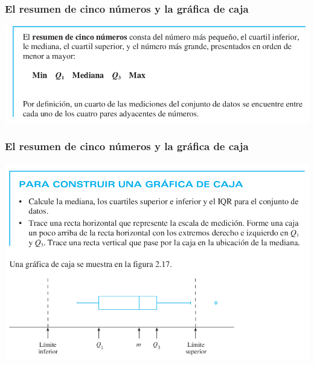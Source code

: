 \documentclass[spanish]{beamer}
\begin{document}
\begin{frame}
\frametitle{El resumen de cinco números y la gráfica de caja}


\begin{center}
\includegraphics[width=\textwidth]{im29}
\end{center}

\end{frame}
\begin{frame}
\frametitle{El resumen de cinco números y la gráfica de caja}


\begin{center}
\includegraphics[width=\textwidth]{im30}
\end{center}

\end{frame}
\end{document}

